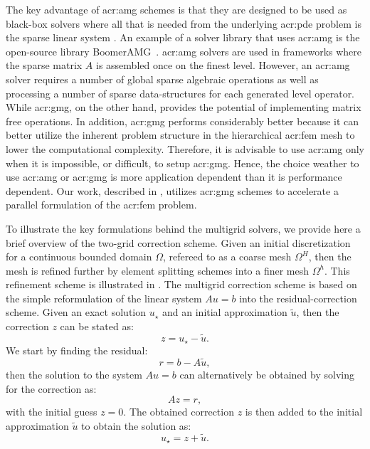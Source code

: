 The key advantage of \gls{acr:amg} schemes is that they are designed to be used as black-box solvers where all that is needed from the underlying \gls{acr:pde} problem is the sparse linear system .
An example of a solver library that uses \gls{acr:amg} is the open-source library BoomerAMG~\cite{bib:boomerAMG}.
\Gls{acr:amg} solvers are used in frameworks where the sparse matrix $A$ is assembled once on the finest level.
However, an \gls{acr:amg} solver requires a number of global sparse algebraic operations as well as processing a number of sparse data-structures for each generated level operator.
While \gls{acr:gmg}, on the other hand, provides the potential of implementing matrix free operations.
In addition, \gls{acr:gmg} performs considerably better because it can better utilize the inherent problem structure in the hierarchical \gls{acr:fem} mesh to lower the computational complexity.
Therefore, it is advisable to use \gls{acr:amg} only when it is impossible, or difficult, to setup \gls{acr:gmg}.
Hence, the choice weather to use \gls{acr:amg} or \gls{acr:gmg} is more application dependent than it is performance dependent.
Our work, described in , utilizes \gls{acr:gmg} schemes to accelerate a parallel formulation of the \gls{acr:fem} problem.


To illustrate the key formulations behind the multigrid solvers, we provide here a brief overview of the two-grid correction scheme.
Given an initial discretization for a continuous bounded domain $\Omega$, refereed to as a coarse mesh $\Omega^H$, then the mesh is refined further by element splitting schemes into a finer mesh $\Omega^h$.
This refinement scheme is illustrated in .
The multigrid correction scheme is based on the simple reformulation of the linear system $Au=b$ into the residual-correction scheme.
Given an exact solution $u_\star$ and an initial approximation $\tilde{u}$, then the correction $z$ can be stated as:
\begin{equation}
	z = u_\star - \tilde{u}. \label{eqn:crr}
\end{equation}
We start by finding the residual:
\begin{equation}
	r = b - A\tilde{u}, \label{eqn:res}
\end{equation}
then the solution to the system $Au=b$ can alternatively be obtained by solving for the correction as:
\begin{equation}
	Az=r, \label{eqn:azr}
\end{equation}
with the initial guess $z=0$. 
The obtained correction $z$ is then added to the initial approximation $\tilde{u}$ to obtain the solution as:
\begin{equation}
	u_\star = z + \tilde{u}.
\end{equation}

